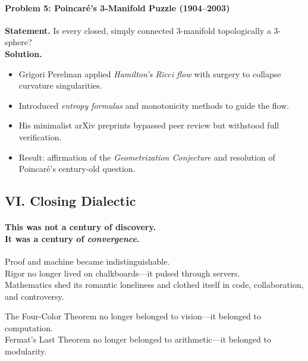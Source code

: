 \documentclass[9pt]{article}
\begin{document}
\paragraph{Problem 5: Poincaré’s 3-Manifold Puzzle (1904--2003)}
\textbf{Statement.} Is every closed, simply connected 3-manifold topologically a 3-sphere? \\
\textbf{Solution.}
\begin{itemize}
  \item Grigori Perelman applied \textit{Hamilton’s Ricci flow} with surgery to collapse curvature singularities.
  \item Introduced \textit{entropy formulas} and monotonicity methods to guide the flow.
  \item His minimalist arXiv preprints bypassed peer review but withstood full verification.
  \item Result: affirmation of the \textit{Geometrization Conjecture} and resolution of Poincaré’s century-old question.
\end{itemize}

\newpage

\subsection*{VI. Closing Dialectic}

\paragraph{This was not a century of discovery. \\
It was a century of \textit{convergence}.}

\medskip

Proof and machine became indistinguishable. \\

\noindent
Rigor no longer lived on chalkboards---it pulsed through servers. \\

\noindent
Mathematics shed its romantic loneliness and clothed itself in code, collaboration, and controversy.

\medskip

The Four-Color Theorem no longer belonged to vision---it belonged to computation. \\

\noindent
Fermat’s Last Theorem no longer belonged to arithmetic---it belonged to modularity. \\
\end{document}

